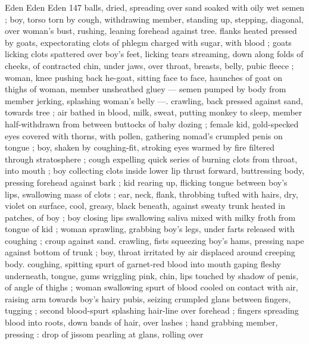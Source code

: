 Eden Eden Eden 147
balls, dried, spreading over sand soaked with oily wet semen ; boy,
torso torn by cough, withdrawing member, standing up, stepping,
diagonal, over woman's bust, rushing, leaning forehead against tree.
flanks heated pressed by goats, expectorating clots of phlegm
charged with sugar, with blood ; goats licking clots spattered over
boy's feet, licking tears streaming, down along folds of cheeks, of
contracted chin, under jaws, over throat, breasts, belly, pubic fleece
; woman, knee pushing back he-goat, sitting face to face, haunches
of goat on thighs of woman, member unsheathed gluey — semen
pumped by body from member jerking, splashing woman's belly —.
crawling, back pressed against sand, towards tree ; air bathed in
blood, milk, sweat, putting monkey to sleep, member half-withdrawn
from between buttocks of baby dozing ; female kid, gold-specked
eyes covered with thorns, with pollen, gathering nomad’s crumpled
penis on tongue ; boy, shaken by coughing-fit, stroking eyes warmed
by fire filtered through stratosphere ; cough expelling quick series of
burning clots from throat, into mouth ; boy collecting clots inside
lower lip thrust forward, buttressing body, pressing forehead against
bark ; kid rearing up, flicking tongue between boy's lips, swallowing
mass of clots ; ear, neck, flank, throbbing tufted with hairs, dry, violet
on surface, cool, greasy, black beneath, against sweaty trunk heated
in patches, of boy ; boy closing lips swallowing saliva mixed with
milky froth from tongue of kid ; woman sprawling, grabbing boy's
legs, under farts released with coughing ; croup against sand.
crawling, fists squeezing boy's hams, pressing nape against bottom
of trunk ; boy, throat irritated by air displaced around creeping body.
coughing, spitting spurt of garnet-red blood into mouth gaping
fleshy underneath, tongue, gums wriggling pink, chin, lips touched
by shadow of penis, of angle of thighs ; woman swallowing spurt of
blood cooled on contact with air, raising arm towards boy's hairy
pubis, seizing crumpled glans between fingers, tugging ; second
blood-spurt splashing hair-line over forehead ; fingers spreading
blood into roots, down bands of hair, over lashes ; hand grabbing
member, pressing : drop of jissom pearling at glans, rolling over

